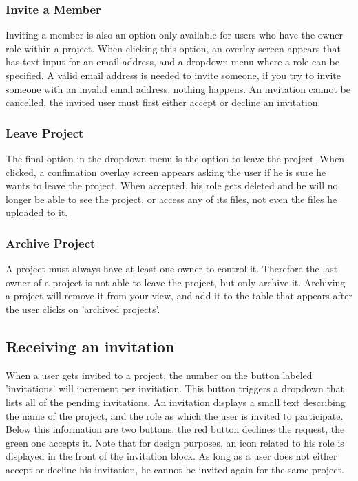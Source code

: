 \subsubsection{Invite a Member}

Inviting a member is also an option only available for users who have the owner role within a project. When clicking this option, an overlay
screen appears that has text input for an email address, and a dropdown menu where a role can be specified. A valid email address is needed
to invite someone, if you try to invite someone with an invalid email address, nothing happens. An invitation cannot be cancelled, the 
invited user must first either accept or decline an invitation.

\subsubsection{Leave Project}

The final option in the dropdown menu is the option to leave the project. When clicked, a confimation overlay screen appears asking the user
if he is sure he wants to leave the project. When accepted, his role gets deleted and he will no longer be able to see the project, or
access any of its files, not even the files he uploaded to it. 

\subsubsection{Archive Project}

A project must always have at least one owner to control it. Therefore the last owner of a project is not able to leave the project, but only
archive it. Archiving a project will remove it from your view, and add it to the table that appears after the user clicks on 'archived projects'.

\subsection{Receiving an invitation}

When a user gets invited to a project, the number on the button labeled 'invitations' will increment per invitation. This button triggers a dropdown
that lists all of the pending invitations. An invitation displays a small text describing the name of the project, and the role as which
the user is invited to participate. Below this information are two buttons, the red button declines the request, the green one accepts it.
Note that for design purposes, an icon related to his role is displayed in the front of the invitation block. 
As long as a user does not either accept or decline his invitation, he cannot be invited again for the same project.

